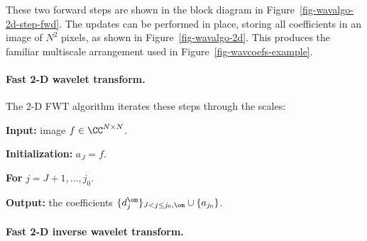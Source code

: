 

These two forward steps are shown in the block diagram in Figure~\ref{fig-wavalgo-2d-step-fwd}.
The updates can be performed in place, storing all coefficients in an image of $N^2$ pixels, as shown in Figure~\ref{fig-wavalgo-2d}. This produces the familiar multiscale arrangement used in Figure~\ref{fig-wavcoefs-example}.

  
\paragraph{Fast 2-D wavelet transform.}

The 2-D FWT algorithm iterates these steps through the scales:
\begin{rs}
	\item \textbf{Input:} image $f \in \CC^{N\times N}$.
	\item \textbf{Initialization:} $a_J = f$.
	\item \textbf{For} $j=J+1,\ldots,j_0$.
	\item \textbf{Output:} the coefficients $\{d_j^\om\}_{J<j\leq j_0,\om} \cup \{ a_{j_0} \}$.
\end{rs}


  
\paragraph{Fast 2-D inverse wavelet transform.}

